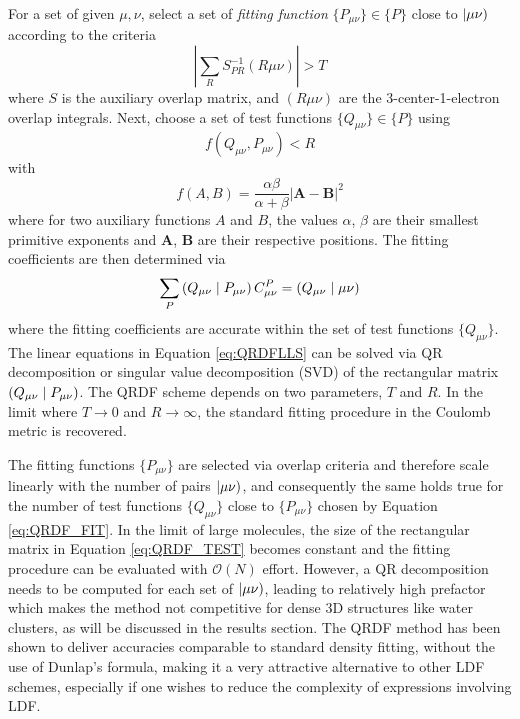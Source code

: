 For a set of given $\mu,\nu$, select a set of \emph{fitting function} $\{P_{\mu\nu}\} \in \{P\}$ close to $\left\lvert \mu\nu \right)$ according to the criteria
\begin{equation}
\left\lvert \sum_R S_{PR}^{-1} (R\mu\nu) \right\rvert > T 
\label{eq:QRDF_FIT}
\end{equation} 
\noindent where $S$ is the auxiliary overlap matrix, and $(R\mu\nu)$ are the 3-center-1-electron overlap integrals. Next, choose a set of test functions $\{Q_{\mu\nu}\} \in \{P\}$ using
\begin{equation}
f(Q_{\mu\nu},P_{\mu\nu}) < R
\label{eq:QRDF_TEST}
\end{equation}
\noindent with
\begin{equation}
f(A,B) = \frac{\alpha \beta}{\alpha + \beta} \left\lvert \mathbf{A} - \mathbf{B} \right\rvert^2
\end{equation}
\noindent where for two auxiliary functions $A$ and $B$, the values $\alpha$, $\beta$ are their smallest primitive exponents and $\mathbf{A}$, $\mathbf{B}$ are their respective positions. The fitting coefficients are then determined via
\begin{equation}
\sum_P \left( Q_{\mu\nu} \mid P_{\mu\nu} \right) C^P_{\mu\nu} = \left( Q_{\mu\nu} \mid \mu\nu \right)
\label{eq:QRDFLLS}
\end{equation}
\noindent where the fitting coefficients are accurate within the set of test functions $\{Q_{\mu\nu}\}$. The linear equations in Equation \ref{eq:QRDFLLS} can be solved via QR decomposition or singular value decomposition (SVD) of the rectangular matrix $\left( Q_{\mu\nu} \mid P_{\mu\nu} \right)$.
The QRDF scheme depends on two parameters, $T$ and $R$. In the limit where $T \rightarrow 0$ and $R \rightarrow \infty$, the standard fitting procedure in the Coulomb metric is recovered. 

The fitting functions $\{P_{\mu\nu}\}$ are selected via overlap criteria and therefore scale linearly with the number of pairs $\left\lvert \mu\nu \right)$, and consequently the same holds true for the number of test functions $\{Q_{\mu\nu}\}$ close to $\{P_{\mu\nu}\}$ chosen by Equation \ref{eq:QRDF_FIT}. In the limit of large molecules, the size of the rectangular matrix in Equation \ref{eq:QRDF_TEST} becomes constant and the fitting procedure can be evaluated with $\mathcal{O}(N)$ effort. However, a QR decomposition needs to be computed for each set of $\left\lvert \mu\nu \right)$, leading to relatively high prefactor which makes the method not competitive for dense 3D structures like water clusters, as will be discussed in the results section.
The QRDF method has been shown to deliver accuracies comparable to standard density fitting, without the use of Dunlap's formula, making it a very attractive alternative to other LDF schemes, especially if one wishes to reduce the complexity of expressions involving LDF.

